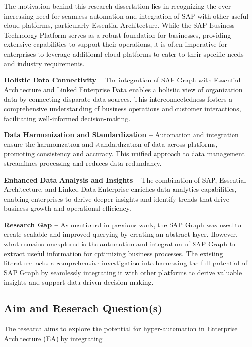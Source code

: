 \documentclass{article}
\begin{document}
The motivation behind this research dissertation lies in recognizing the ever-increasing need for seamless automation and integration of SAP with other useful cloud platforms, particularly Essential Architecture. While the SAP Business Technology Platform serves as a robust foundation for businesses, providing extensive capabilities to support their operations, it is often imperative for enterprises to leverage additional cloud platforms to cater to their specific needs and industry requirements.

\textbf{Holistic Data Connectivity –} The integration of SAP Graph with Essential Architecture and Linked Enterprise Data enables a holistic view of organization data by connecting disparate data sources. This interconnectedness fosters a comprehensive understanding of business operations and customer interactions, facilitating well-informed decision-making.

\textbf{Data Harmonization and Standardization –} Automation and integration ensure the harmonization and standardization of data across platforms, promoting consistency and accuracy. This unified approach to data management streamlines processing and reduces data redundancy.

\textbf{Enhanced Data Analysis and Insights –} The combination of SAP, Essential Architecture, and Linked Data Enterprise enriches data analytics capabilities, enabling enterprises to derive deeper insights and identify trends that drive business growth and operational efficiency.

\textbf{Research Gap –} As mentioned in previous work, the SAP Graph was used to create scalable and improved querying by creating an abstract layer. However, what remains unexplored is the automation and integration of SAP Graph to extract useful information for optimizing business processes. The existing literature lacks a comprehensive investigation into harnessing the full potential of SAP Graph by seamlessly integrating it with other platforms to derive valuable insights and support data-driven decision-making.

\maketitle
\subsection{Aim and Reserach Question(s)}
The research aims to explore the potential for hyper-automation in Enterprise Architecture (EA) by integrating
\end{document}
